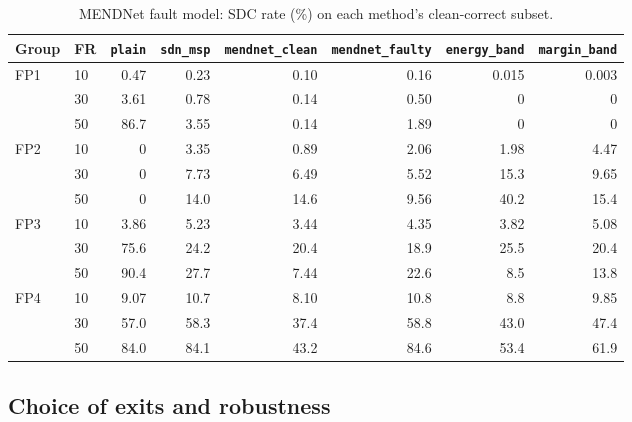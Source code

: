 \documentclass[10pt,a4paper]{article}
\newcommand{\meth}[1]{\texttt{#1}}
\newcommand{\ours}{\meth{margin\_band}}
\begin{document}
\begin{table}[H]
\centering\small
\caption{MENDNet fault model: SDC rate (\%) on each method's clean-correct subset.}
\label{tab:mendsdc}
\begin{adjustbox}{max width=\linewidth}
\begin{tabular}{@{}llrrrrrr@{}}
\toprule
Group & FR & \meth{plain} & \meth{sdn\_msp} & \meth{mendnet\_clean} & \meth{mendnet\_faulty} & \meth{energy\_band} & \ours \\
\midrule
FP1 & 10 & 0.47 & 0.23 & 0.10 & 0.16 & 0.015 & 0.003 \\
    & 30 & 3.61 & 0.78 & 0.14 & 0.50 & 0     & 0 \\
    & 50 & 86.7 & 3.55 & 0.14 & 1.89 & 0     & 0 \\
FP2 & 10 & 0    & 3.35 & 0.89 & 2.06 & 1.98  & 4.47 \\
    & 30 & 0    & 7.73 & 6.49 & 5.52 & 15.3  & 9.65 \\
    & 50 & 0    & 14.0 & 14.6 & 9.56 & 40.2  & 15.4 \\
FP3 & 10 & 3.86 & 5.23 & 3.44 & 4.35 & 3.82  & 5.08 \\
    & 30 & 75.6 & 24.2 & 20.4 & 18.9 & 25.5  & 20.4 \\
    & 50 & 90.4 & 27.7 & 7.44 & 22.6 & 8.5   & 13.8 \\
FP4 & 10 & 9.07 & 10.7 & 8.10 & 10.8 & 8.8   & 9.85 \\
    & 30 & 57.0 & 58.3 & 37.4 & 58.8 & 43.0  & 47.4 \\
    & 50 & 84.0 & 84.1 & 43.2 & 84.6 & 53.4  & 61.9 \\
\bottomrule
\end{tabular}
\end{adjustbox}
\end{table}

\subsection{Choice of exits and robustness}
\end{document}
